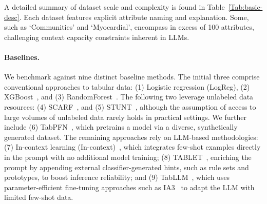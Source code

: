 A detailed summary of dataset scale and complexity is found in Table~\ref{Tab:basic-desc}.
Each dataset features explicit attribute naming and explanation. Some, such as `Communities' and `Myocardial', encompass in excess of 100 attributes, challenging context capacity constraints inherent in LLMs.

\vspace*{-0.12in}
\paragraph{Baselines.}
We benchmark against nine distinct baseline methods. The initial three comprise conventional approaches to tabular data: (1) Logistic regression (LogReg), (2) XGBoost~\cite{chen2016xgboost}, and (3) RandomForest~\cite{ho1995random}. The following two leverage unlabeled data resources: (4) SCARF~\cite{bahri2022scarf}, and (5) STUNT~\cite{nam2023stunt}, although the assumption of access to large volumes of unlabeled data rarely holds in practical settings. We further include (6) TabPFN~\cite{hollmann2022tabpfn}, which pretrains a model via a diverse, synthetically generated dataset. The remaining approaches rely on LLM-based methodologies: (7) In-context learning (In-context)~\cite{wei2022emergent}, which integrates few-shot examples directly in the prompt with no additional model training; (8) TABLET~\cite{slack2023tablet}, enriching the prompt by appending external classifier-generated hints, such as rule sets and prototypes, to boost inference reliability; and (9) TabLLM~\cite{hegselmann2023tabllm}, which uses parameter-efficient fine-tuning approaches such as IA3~\cite{liu2022few} to adapt the LLM with limited few-shot data.

\vspace*{-0.12in}

